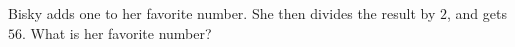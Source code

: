 Bisky adds one to her favorite number. She then divides the result by $2$, and gets $56$. What is her favorite number?
